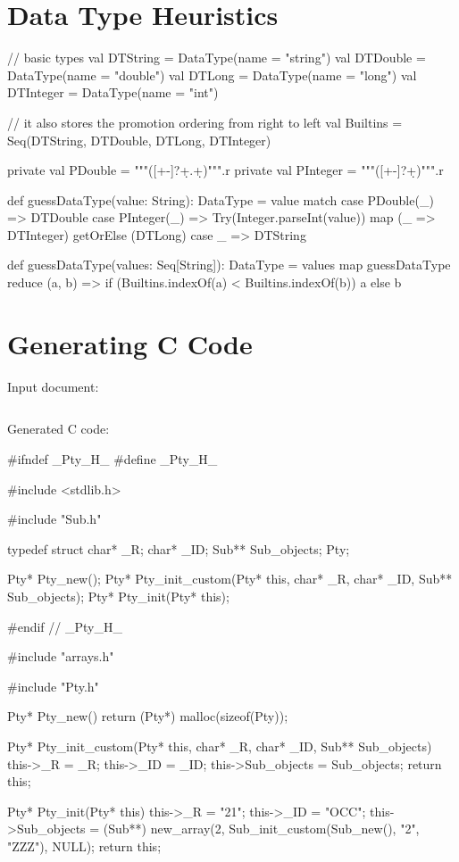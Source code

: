 \section{Data Type Heuristics}
\label{sec:AppendixGuessDataType}

\begin{scalacode}
  // basic types
  val DTString = DataType(name = "string")
  val DTDouble = DataType(name = "double")
  val DTLong = DataType(name = "long")
  val DTInteger = DataType(name = "int")

  // it also stores the promotion ordering from right to left
  val Builtins = Seq(DTString, DTDouble, DTLong, DTInteger)

  private val PDouble = """([+-]?\d+.\d+)""".r
  private val PInteger = """([+-]?\d+)""".r

  def guessDataType(value: String): DataType = value match {
    case PDouble(_) => DTDouble
    case PInteger(_) => Try(Integer.parseInt(value)) map (_ => DTInteger) getOrElse (DTLong)
    case _ => DTString
  }

  def guessDataType(values: Seq[String]): DataType =
    values map guessDataType reduce { (a, b) =>
      if (Builtins.indexOf(a) < Builtins.indexOf(b)) a else b
    }
\end{scalacode}


\section{Generating C Code}
\label{sec:AppendixGeneratingCCode}

Input document:

\inputminted[fontsize=\fontsize{8}{8},linenos,numbersep=5pt,frame=lines,framesep=2mm]{xml}{listings/example-for-c-code.xml}

\noindent Generated C code:

\begin{ccode}
#ifndef _Pty_H_
#define _Pty_H_

#include <stdlib.h>

#include "Sub.h"

typedef struct {
  char* _R;
  char* _ID;
  Sub** Sub_objects;
} Pty;

Pty* Pty_new();
Pty* Pty_init_custom(Pty* this, char* _R, char* _ID, Sub** Sub_objects);
Pty* Pty_init(Pty* this);

#endif // _Pty_H_	
\end{ccode}
%
\begin{ccode}
#include "arrays.h"

#include "Pty.h"

Pty* Pty_new() {
  return (Pty*) malloc(sizeof(Pty));
}

Pty* Pty_init_custom(Pty* this, char* _R, char* _ID, Sub** Sub_objects) {
  this->_R = _R;
  this->_ID = _ID;
  this->Sub_objects = Sub_objects;
  return this;
}

Pty* Pty_init(Pty* this) {
  this->_R = "21";
  this->_ID = "OCC";
  this->Sub_objects = (Sub**) new_array(2, Sub_init_custom(Sub_new(), "2", "ZZZ"), NULL);
  return this;
}
\end{ccode}

